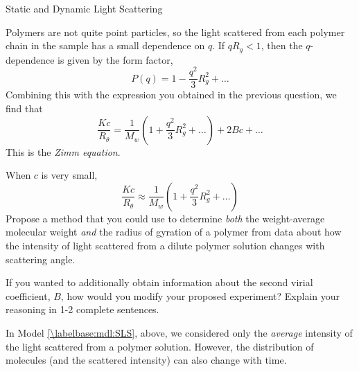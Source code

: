 \begin{activity}{Static and Dynamic Light Scattering}
\begin{ctqs}
	
\end{ctqs}

\begin{infobox}

	Polymers are not quite point particles, so the light scattered from each polymer chain in the sample has a small dependence on $q$.  If $qR_g < 1$, then the $q$-dependence is given by the form factor,
	\begin{equation*}
		P(q) = 1 - \frac{q^2}{3}R_g^2 + \dots
	\end{equation*}
	Combining this with the expression you obtained in the previous question, we find that
	\begin{equation*}
		\frac{Kc}{R_\theta} = \frac{1}{M_w}\left( 1 + \frac{q^2}{3} R_g^2 + \dots \right) + 2Bc + \dots
	\end{equation*}
	This is the \emph{Zimm equation}.
\end{infobox}

\begin{ctqs}
	
	\question When $c$ is very small,
		\begin{equation*}
			\frac{Kc}{R_\theta} \approx \frac{1}{M_w}\left(1 + \frac{q^2}{3}R_g^2 + \dots\right)
		\end{equation*}
		Propose a method that you could use to determine \emph{both} the weight-average molecular weight \emph{and} the radius of gyration of a polymer from data about how the intensity of light scattered from a dilute polymer solution changes with scattering angle.
		
		\begin{solution}[2.5in]
		\end{solution}
		
	\question If you wanted to additionally obtain information about the second virial coefficient, $B$, how would you modify your proposed experiment?  Explain your reasoning in 1-2 complete sentences.
		
		\begin{solution}[1.5in]
		\end{solution}
		
\end{ctqs}


\begin{model}
	\label{\labelbase:mdl:DLS}
	
	In Model \ref{\labelbase:mdl:SLS}, above, we considered only the \emph{average} intensity of the light scattered from a polymer solution.   However, the distribution of molecules (and the scattered intensity) can also change with time.
	

\end{model}
\end{activity}
